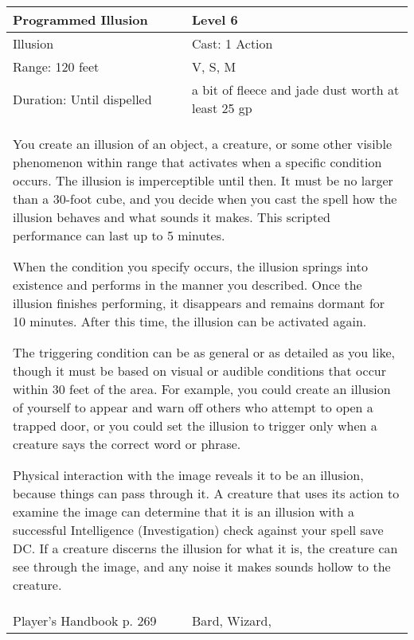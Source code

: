 \documentclass[11pt]{report}
\begin{document}
\begin{table}[H]
	\begin{tabular}{||p{6cm}|p{6cm}||}
		\hline\hline
		\bf{Programmed Illusion} & Level 6\\ \hline
		Illusion & Cast: 1 Action\\ \hline
		Range: 120 feet & V, S, M\\ \hline
		Duration: Until dispelled & a bit of fleece and jade dust worth at least 25 gp\\ \hline
		\multicolumn{2}{||p{12cm}||}{You create an illusion of an object, a creature, or some other visible phenomenon within range that activates when a specific condition occurs. The illusion is imperceptible until then. It must be no larger than a 30-foot cube, and you decide when you cast the spell how the illusion behaves and what sounds it makes. This scripted performance can last up to 5 minutes.

When the condition you specify occurs, the illusion springs into existence and performs in the manner you described. Once the illusion finishes performing, it disappears and remains dormant for 10 minutes. After this time, the illusion can be activated again.

The triggering condition can be as general or as detailed as you like, though it must be based on visual or audible conditions that occur within 30 feet of the area. For example, you could create an illusion of yourself to appear and warn off others who attempt to open a trapped door, or you could set the illusion to trigger only when a creature says the correct word or phrase.

Physical interaction with the image reveals it to be an illusion, because things can pass through it. A creature that uses its action to examine the image can determine that it is an illusion with a successful Intelligence (Investigation) check against your spell save DC. If a creature discerns the illusion for what it is, the creature can see through the image, and any noise it makes sounds hollow to the creature.}\\ \hline
Player's Handbook p. 269 & Bard, Wizard, \\ \hline\hline
	\end{tabular}
\end{table}
\end{document}

